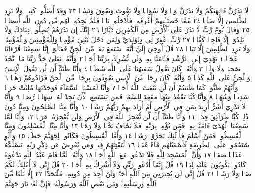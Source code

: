 لَا تَذَرُنَّ ءَالِهَتَكُمْ وَلَا تَذَرُنَّ وَدࣰّا وَلَا سُوَاعࣰا وَلَا يَغُوثَ وَيَعُوقَ
وَنَسْرࣰا ٢٣ وَقَدْ أَضَلُّوا۟ كَثِيرࣰاۖ وَلَا تَزِدِ ٱلظَّٰلِمِينَ إِلَّا ضَلَٰلࣰا ٢٤
مِّمَّا خَطِيٓـَٰٔتِهِمْ أُغْرِقُوا۟ فَأُدْخِلُوا۟ نَارࣰا فَلَمْ يَجِدُوا۟ لَهُم مِّن دُونِ
ٱللَّهِ أَنصَارࣰا ٢٥ وَقَالَ نُوحࣱ رَّبِّ لَا تَذَرْ عَلَى ٱلْأَرْضِ مِنَ ٱلْكَٰفِرِينَ
دَيَّارًا ٢٦ إِنَّكَ إِن تَذَرْهُمْ يُضِلُّوا۟ عِبَادَكَ وَلَا يَلِدُوٓا۟ إِلَّا فَاجِرࣰا
كَفَّارࣰا ٢٧ رَّبِّ ٱغْفِرْ لِي وَلِوَٰلِدَيَّ وَلِمَن دَخَلَ بَيْتِيَ مُؤْمِنࣰا
وَلِلْمُؤْمِنِينَ وَٱلْمُؤْمِنَٰتِۖ وَلَا تَزِدِ ٱلظَّٰلِمِينَ إِلَّا تَبَارَۢا ٢٨
قُلْ أُوحِيَ إِلَيَّ أَنَّهُ ٱسْتَمَعَ نَفَرࣱ مِّنَ ٱلْجِنِّ فَقَالُوٓا۟ إِنَّا سَمِعْنَا قُرْءَانًا
عَجَبࣰا ١ يَهْدِيٓ إِلَى ٱلرُّشْدِ فَـَٔامَنَّا بِهِۦۖ وَلَن نُّشْرِكَ بِرَبِّنَآ أَحَدࣰا ٢
وَأَنَّهُۥ تَعَٰلَىٰ جَدُّ رَبِّنَا مَا ٱتَّخَذَ صَٰحِبَةࣰ وَلَا وَلَدࣰا ٣ وَأَنَّهُۥ كَانَ
يَقُولُ سَفِيهُنَا عَلَى ٱللَّهِ شَطَطࣰا ٤ وَأَنَّا ظَنَنَّآ أَن لَّن تَقُولَ ٱلْإِنسُ
وَٱلْجِنُّ عَلَى ٱللَّهِ كَذِبࣰا ٥ وَأَنَّهُۥ كَانَ رِجَالࣱ مِّنَ ٱلْإِنسِ يَعُوذُونَ بِرِجَالࣲ
مِّنَ ٱلْجِنِّ فَزَادُوهُمْ رَهَقࣰا ٦ وَأَنَّهُمْ ظَنُّوا۟ كَمَا ظَنَنتُمْ أَن لَّن يَبْعَثَ
ٱللَّهُ أَحَدࣰا ٧ وَأَنَّا لَمَسْنَا ٱلسَّمَآءَ فَوَجَدْنَٰهَا مُلِئَتْ حَرَسࣰا
شَدِيدࣰا وَشُهُبࣰا ٨ وَأَنَّا كُنَّا نَقْعُدُ مِنْهَا مَقَٰعِدَ لِلسَّمْعِۖ فَمَن
يَسْتَمِعِ ٱلْأٓنَ يَجِدْ لَهُۥ شِهَابࣰا رَّصَدࣰا ٩ وَأَنَّا لَا نَدْرِيٓ أَشَرٌّ أُرِيدَ
بِمَن فِي ٱلْأَرْضِ أَمْ أَرَادَ بِهِمْ رَبُّهُمْ رَشَدࣰا ١٠ وَأَنَّا مِنَّا ٱلصَّٰلِحُونَ
وَمِنَّا دُونَ ذَٰلِكَۖ كُنَّا طَرَآئِقَ قِدَدࣰا ١١ وَأَنَّا ظَنَنَّآ أَن لَّن نُّعْجِزَ
ٱللَّهَ فِي ٱلْأَرْضِ وَلَن نُّعْجِزَهُۥ هَرَبࣰا ١٢ وَأَنَّا لَمَّا سَمِعْنَا ٱلْهُدَىٰٓ
ءَامَنَّا بِهِۦۖ فَمَن يُؤْمِنۢ بِرَبِّهِۦ فَلَا يَخَافُ بَخْسࣰا وَلَا رَهَقࣰا ١٣
وَأَنَّا مِنَّا ٱلْمُسْلِمُونَ وَمِنَّا ٱلْقَٰسِطُونَۖ فَمَنْ أَسْلَمَ فَأُو۟لَٰٓئِكَ
تَحَرَّوْا۟ رَشَدࣰا ١٤ وَأَمَّا ٱلْقَٰسِطُونَ فَكَانُوا۟ لِجَهَنَّمَ حَطَبࣰا ١٥
وَأَلَّوِ ٱسْتَقَٰمُوا۟ عَلَى ٱلطَّرِيقَةِ لَأَسْقَيْنَٰهُم مَّآءً غَدَقࣰا ١٦ لِّنَفْتِنَهُمْ
فِيهِۚ وَمَن يُعْرِضْ عَن ذِكْرِ رَبِّهِۦ يَسْلُكْهُ عَذَابࣰا صَعَدࣰا ١٧ وَأَنَّ
ٱلْمَسَٰجِدَ لِلَّهِ فَلَا تَدْعُوا۟ مَعَ ٱللَّهِ أَحَدࣰا ١٨ وَأَنَّهُۥ لَمَّا قَامَ عَبْدُ ٱللَّهِ
يَدْعُوهُ كَادُوا۟ يَكُونُونَ عَلَيْهِ لِبَدࣰا ١٩ قُلْ إِنَّمَآ أَدْعُوا۟ رَبِّي وَلَآ أُشْرِكُ
بِهِۦٓ أَحَدࣰا ٢٠ قُلْ إِنِّي لَآ أَمْلِكُ لَكُمْ ضَرࣰّا وَلَا رَشَدࣰا ٢١ قُلْ إِنِّي
لَن يُجِيرَنِي مِنَ ٱللَّهِ أَحَدࣱ وَلَنْ أَجِدَ مِن دُونِهِۦ مُلْتَحَدًا ٢٢ إِلَّا بَلَٰغࣰا
مِّنَ ٱللَّهِ وَرِسَٰلَٰتِهِۦۚ وَمَن يَعْصِ ٱللَّهَ وَرَسُولَهُۥ فَإِنَّ لَهُۥ نَارَ جَهَنَّمَ
